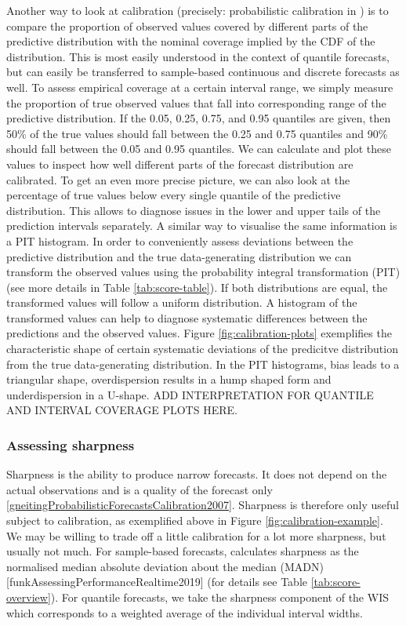 \documentclass[article,shortnames]{jss}
\begin{document}
Another way to look at calibration (precisely: probabilistic calibration in \cite{gneitingProbabilisticForecastsCalibration2007}) is to compare the proportion of observed values covered by different parts of the predictive distribution with the nominal coverage implied by the CDF of the distribution. This is most easily understood in the context of quantile forecasts, but can easily be transferred to sample-based continuous and discrete forecasts as well. 
%
To assess empirical coverage at a certain interval range, we simply measure the proportion of true observed values that fall into corresponding range of the predictive distribution. If the 0.05, 0.25, 0.75, and 0.95 quantiles are given, then 50\% of the true values should fall between the 0.25 and 0.75 quantiles and 90\% should fall between the 0.05 and 0.95 quantiles. We can calculate and plot these values to inspect how well different parts of the forecast distribution are calibrated. 
%
To get an even more precise picture, we can also look at the percentage of true values below every single quantile of the predictive distribution. This allows to diagnose issues in the lower and upper tails of the prediction intervals separately. A similar way to visualise the same information is a PIT histogram. In order to conveniently assess deviations between the predictive distribution and the true data-generating distribution we can transform the observed values using the probability integral transformation (PIT) \citep{dawidPresentPositionPotential1984} (see more details in Table \ref{tab:score-table}). If both distributions are equal, the transformed values will follow a uniform distribution. A histogram of the transformed values can help to diagnose systematic differences between the predictions and the observed values. Figure \ref{fig:calibration-plots} exemplifies the characteristic shape of certain systematic deviations of the predicitve distribution from the true data-generating distribution. In the PIT histograms, bias leads to a triangular shape, overdispersion results in a hump shaped form and underdispersion in a U-shape. ADD INTERPRETATION FOR QUANTILE AND INTERVAL COVERAGE PLOTS HERE. 

\subsubsection{Assessing sharpness}

Sharpness is the ability to produce narrow forecasts. It does not depend on the actual observations and is a quality of the forecast only \ref{gneitingProbabilisticForecastsCalibration2007}. Sharpness is therefore only useful subject to calibration, as exemplified above in Figure \ref{fig:calibration-example}. We may be willing to trade off a little calibration for a lot more sharpness, but usually not much. For sample-based forecasts,  calculates sharpness as the normalised median absolute deviation about the median (MADN) [funkAssessingPerformanceRealtime2019] (for details see Table \ref{tab:score-overview}). For quantile forecasts, we take the sharpness component of the WIS which corresponds to a weighted average of the individual interval widths. 
\end{document}

